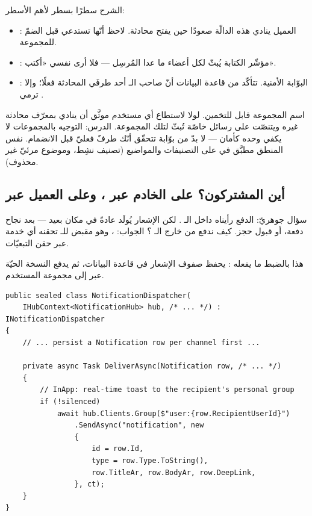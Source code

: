الشرح سطرًا بسطر لأهم الأسطر:
\begin{itemize}
\item {}: العميل ينادي هذه الدالّة صعودًا حين يفتح محادثة.
  لاحظ أنّها تستدعي  قبل الضمّ للمجموعة.
\item {}: مؤشّر الكتابة يُبثّ لكل أعضاء
   ما عدا المُرسِل — فلا أرى نفسي «أكتب».
\item {}: البوّابة الأمنية. تتأكّد من قاعدة البيانات
  أنّ صاحب الـ  أحد طرفَي المحادثة فعلًا؛ وإلا ترمي .
\end{itemize}

\begin{spotlight}
اسم المجموعة  قابل للتخمين. لولا
 لاستطاع أي مستخدم موثَّق أن ينادي
 بمعرّف محادثة غيره ويتنصّت على رسائل خاصّة تُبثّ لتلك
المجموعة. الدرس: التوجيه بالمجموعات لا يكفي وحده كأمان — لا بدّ من بوّابة
تتحقّق أنّك طرفٌ فعليّ قبل الانضمام. نفس المنطق مطبَّق في  على
التصنيفات والمواضيع (تصنيف نشِط، وموضوع مرئيّ غير محذوف).
\end{spotlight}

\subsection{أين المشتركون؟ على الخادم عبر ، وعلى العميل عبر }

سؤال جوهريّ: الدفع رأيناه داخل الـ . لكن الإشعار يُولَد عادةً في
مكان بعيد — بعد نجاح دفعة، أو قبول حجز. كيف ندفع من خارج الـ ؟ الجواب:
، وهو مقبض للـ  تحقنه أي خدمة عبر حقن التبعيّات.

هذا بالضبط ما يفعله : يحفظ صفوف الإشعار في قاعدة
البيانات، ثم يدفع النسخة الحيّة عبر  إلى مجموعة المستخدم.

\begin{english}
\begin{lstlisting}[language={[Sharp]C}]
public sealed class NotificationDispatcher(
    IHubContext<NotificationHub> hub, /* ... */) : INotificationDispatcher
{
    // ... persist a Notification row per channel first ...

    private async Task DeliverAsync(Notification row, /* ... */)
    {
        // InApp: real-time toast to the recipient's personal group
        if (!silenced)
            await hub.Clients.Group($"user:{row.RecipientUserId}")
                .SendAsync("notification", new
                {
                    id = row.Id,
                    type = row.Type.ToString(),
                    row.TitleAr, row.BodyAr, row.DeepLink,
                }, ct);
    }
}
\end{lstlisting}
\end{english}

